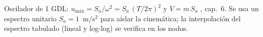 Oscilador de 1 GDL: $u_\text{máx}=S_a/\omega^2=S_a\,(T/2\pi)^2$ y $V=m\,S_a$ \cite{chopra}, cap.~6. Se usa un espectro unitario $S_a=1$~m/s$^2$ para aislar la cinemática; la interpolación del espectro tabulado (lineal y log-log) se verifica en los nodos.
